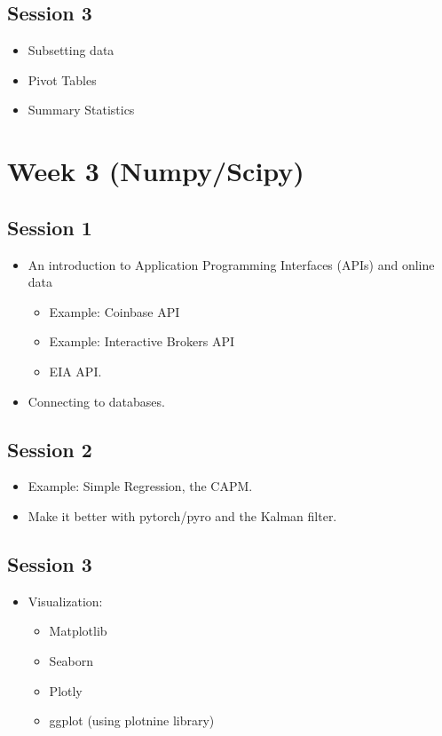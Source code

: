 \documentclass[11pt]{article}
\begin{document}
\subsection{Session 3}
\label{sec:orgb726fdc}
\begin{itemize}
\item Subsetting data
\item Pivot Tables
\item Summary Statistics
\end{itemize}


\section{Week 3 (Numpy/Scipy)}
\label{sec:org22cbb59}

\subsection{Session 1}
\label{sec:org1c901e2}

\begin{itemize}
\item An introduction to Application Programming Interfaces (APIs) and online
data
\begin{itemize}
\item Example: Coinbase API
\item Example: Interactive Brokers API
\item EIA API.
\end{itemize}
\item Connecting to databases.
\end{itemize}


\subsection{Session 2}
\label{sec:orgf217745}
\begin{itemize}
\item Example: Simple Regression, the CAPM.
\item Make it better with pytorch/pyro and the Kalman filter.
\end{itemize}

\subsection{Session 3}
\label{sec:orge2faade}
\begin{itemize}
\item Visualization:
\begin{itemize}
\item Matplotlib
\item Seaborn
\item Plotly
\item ggplot (using plotnine library)
\end{itemize}
\end{itemize}
\end{document}
